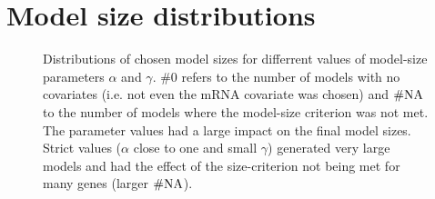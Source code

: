 
\section{Model size distributions\label{app:model-sizes}}

\begin{figure}[htb]
  \centering
  \caption{Distributions of chosen model sizes for differrent values of model-size parameters $\alpha$ and $\gamma$.
  $\# 0$ refers to the number of models with no covariates (i.e. not even the mRNA covariate was chosen)
  and $\# \textup{NA}$ to the number of models where the model-size criterion was not met.
  The parameter values had a large impact on the final model sizes. Strict values
  ($\alpha$ close to one and small $\gamma$) generated very large models and had the
  effect of the size-criterion not being met for many genes (larger $\# \textup{NA}$).}
  \label{fig:model-size-distribution}
\end{figure}
